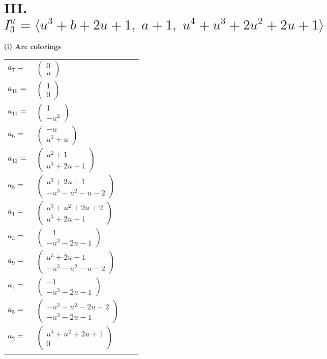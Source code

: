 \documentclass[1p]{elsarticle_modified}
\theoremstyle{definition}
\begin{document}
\centering \section*{III. $I^u_{3}= \langle u^3+b+2 u+1,\;a+1,\;u^4+u^3+2 u^2+2 u+1 \rangle$}
\flushleft \textbf{(i) Arc colorings}\\
\begin{tabular}{m{7pt} m{180pt} m{7pt} m{180pt} }
\flushright $a_{7}=$&$\begin{pmatrix}0\\u\end{pmatrix}$ \\
\flushright $a_{10}=$&$\begin{pmatrix}1\\0\end{pmatrix}$ \\
\flushright $a_{11}=$&$\begin{pmatrix}1\\- u^2\end{pmatrix}$ \\
\flushright $a_{6}=$&$\begin{pmatrix}- u\\u^3+u\end{pmatrix}$ \\
\flushright $a_{12}=$&$\begin{pmatrix}u^2+1\\u^3+2 u+1\end{pmatrix}$ \\
\flushright $a_{8}=$&$\begin{pmatrix}u^3+2 u+1\\- u^3- u^2- u-2\end{pmatrix}$ \\
\flushright $a_{1}=$&$\begin{pmatrix}u^3+u^2+2 u+2\\u^3+2 u+1\end{pmatrix}$ \\
\flushright $a_{3}=$&$\begin{pmatrix}-1\\- u^3-2 u-1\end{pmatrix}$ \\
\flushright $a_{9}=$&$\begin{pmatrix}u^3+2 u+1\\- u^3- u^2- u-2\end{pmatrix}$ \\
\flushright $a_{4}=$&$\begin{pmatrix}-1\\- u^3-2 u-1\end{pmatrix}$ \\
\flushright $a_{5}=$&$\begin{pmatrix}- u^3- u^2-2 u-2\\- u^3-2 u-1\end{pmatrix}$ \\
\flushright $a_{2}=$&$\begin{pmatrix}u^3+u^2+2 u+1\\0\end{pmatrix}$\\&\end{tabular}
\end{document}
